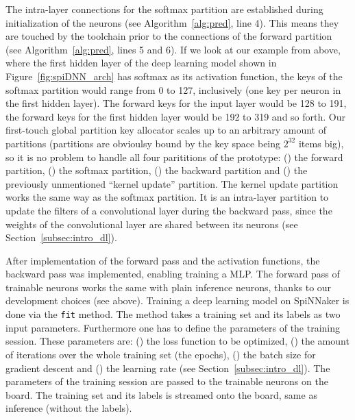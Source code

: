 \documentclass[]{article}
\begin{document}
The intra-layer connections for the softmax partition are established
during initialization of the neurons (see Algorithm~\ref{alg:pred},
line 4).
This means they are touched by the toolchain prior to the connections
of the forward partition (see Algorithm~\ref{alg:pred}, lines 5 and
6).
If we look at our example from above, where the first hidden layer
of the deep learning model shown in Figure~\ref{fig:spiDNN_arch} has
softmax as its activation function, the keys of the softmax partition
would range from 0 to 127, inclusively (one key per neuron in the
first hidden layer).
The forward keys for the input layer would be 128 to 191, the
forward keys for the first hidden layer would be 192 to 319 and so
forth.
Our first-touch global partition key allocator scales up to an
arbitrary amount of partitions (partitions are obvioulsy bound by the
key space being $2^{32}$ items big), so it is no problem to handle all
four parititions of the prototype:
() the forward partition, () the
softmax partition, () the backward partition and
() the previously unmentioned ``kernel update''
partition.
The kernel update partition works the same way as the softmax
partition.
It is an intra-layer partition to update the filters of a
convolutional layer during the backward pass, since the weights of
the convolutional layer are shared between its neurons
(see Section~\ref{subsec:intro_dl}).

After implementation of the forward pass and the activation functions,
the backward pass was implemented, enabling training a MLP.
The forward pass of trainable neurons works the same with plain
inference neurons, thanks to our development choices (see above).
Training a deep learning model on SpiNNaker is done via the
\texttt{fit} method.
The method takes a training set and its labels as two input
parameters.
Furthermore one has to define the parameters of the training session.
These parameters are: () the loss function to be
optimized, () the amount of iterations over the whole
training set (the epochs), () the batch size for
gradient descent and () the learning rate
(see Section~\ref{subsec:intro_dl}).
The parameters of the training session are passed to the trainable
neurons on the board.
The training set and its labels is streamed onto the board, same as
inference (without the labels).
\end{document}
